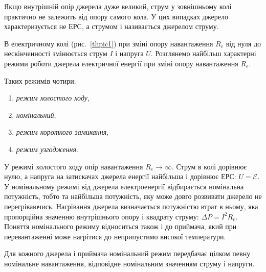\documentclass{LabWork}
\begin{document}
Якщо внутрішній опір джерела дуже великий, струм у зовнішньому колі практично не залежить від опору самого кола. У цих випадках джерело характеризується не ЕРС, а струмом і називається джерелом струму.

В електричному колі (рис.~\ref{thpic1}) при зміні опору навантаження $R_e$ від нуля до нескінченності змінюється струм $I$ і напруга $U$. Розглянемо найбільш характерні режими роботи джерела електричної енергії при зміні опору навантаження $R_e$.

Таких режимів чотири:
\begin{enumerate}
	\item \emph{режим холостого ходу},
	\item \emph{номінальний},
	\item \emph{режим короткого замикання},
	\item \emph{режим узгодження}.
\end{enumerate}


У режимі холостого ходу опір навантаження $R_e \to \infty$. Струм в колі дорівнює нулю, а напруга на затискачах джерела енергії найбільша і дорівнює ЕРС: $U = \mathcal{E}$. У номінальному режимі від джерела електроенергії відбирається номінальна потужність, тобто та найбільша потужність, яку може довго розвивати джерело не перегріваючись. Нагрівання джерела визначається потужністю втрат  в ньому, яка пропорційна значенню внутрішнього опору і квадрату струму: $\Delta P = I^2R_e$. Поняття номінального режиму відноситься також і до приймача, який при перевантаженні може нагрітися до неприпустимо високої температури.

Для кожного джерела і приймача номінальний режим передбачає цілком певну номінальне навантаження, відповідне номінальним значенням струму і напруги.
\end{document}
